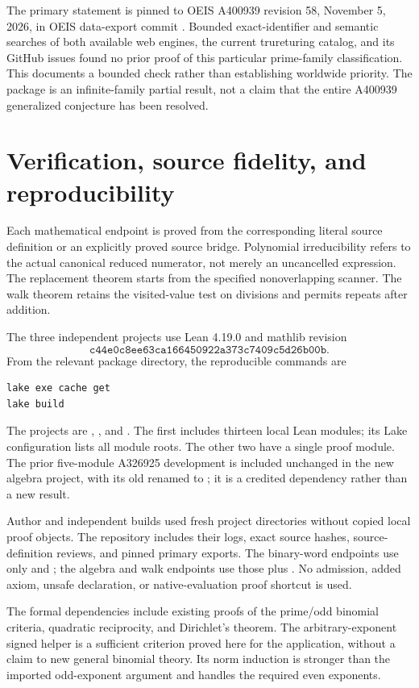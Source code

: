 \documentclass[11pt]{article}
\begin{document}
The primary statement is pinned to OEIS A400939 revision 58,
November 5, 2026, in OEIS data-export commit
.
Bounded exact-identifier and semantic searches of both available web
engines, the current trureturing catalog, and its GitHub issues found
no prior proof of this particular prime-family classification. This
documents a bounded check rather than establishing worldwide priority.
The package is an infinite-family partial result, not a claim that
the entire A400939 generalized conjecture has been resolved.


\section{Verification, source fidelity, and reproducibility}

Each mathematical endpoint is proved from the corresponding literal
source definition or an explicitly proved source bridge. Polynomial
irreducibility refers to the actual canonical reduced numerator, not
merely an uncancelled expression. The replacement theorem starts from
the specified nonoverlapping scanner. The walk theorem retains the
visited-value test on divisions and permits repeats after addition.

The three independent projects use Lean 4.19.0 and mathlib revision
\[
\texttt{c44e0c8ee63ca166450922a373c7409c5d26b00b}.
\]
From the relevant package directory, the reproducible commands are
\begin{verbatim}
lake exe cache get
lake build
\end{verbatim}
The projects are , , and
. The first includes thirteen local Lean modules; its
Lake configuration lists all module roots. The other two have a
single proof module. The prior five-module A326925 development is
included unchanged in the new algebra project, with its old
 renamed to ; it is a credited
dependency rather than a new result.

Author and independent builds used fresh project directories without
copied local proof objects. The repository includes their logs, exact
source hashes, source-definition reviews, and pinned primary exports.
The binary-word endpoints use only  and
; the algebra and walk endpoints use those plus
. No admission, added axiom, unsafe declaration,
or native-evaluation proof shortcut is used.

The formal dependencies include existing proofs of the prime/odd
binomial criteria, quadratic reciprocity, and Dirichlet's theorem.
The arbitrary-exponent signed helper is a sufficient criterion
proved here for the application, without a claim to new general
binomial theory. Its norm induction is stronger than the imported
odd-exponent argument and handles the required even exponents.
\end{document}
